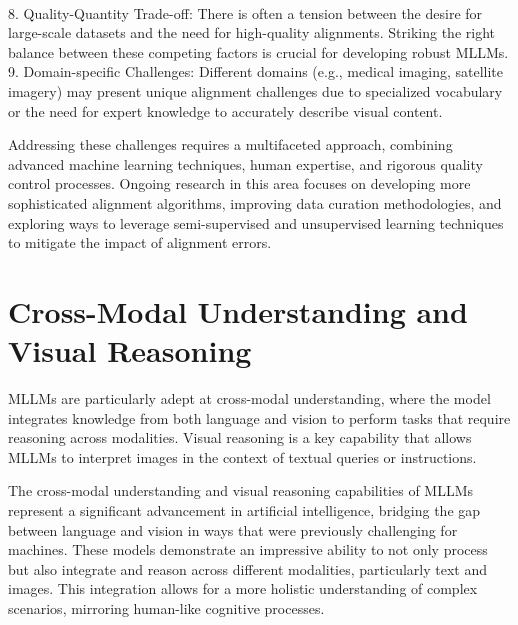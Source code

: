 \\
8. Quality-Quantity Trade-off: There is often a tension between the desire for large-scale datasets and the need for high-quality alignments. Striking the right balance between these competing factors is crucial for developing robust MLLMs.
\\
9. Domain-specific Challenges: Different domains (e.g., medical imaging, satellite imagery) may present unique alignment challenges due to specialized vocabulary or the need for expert knowledge to accurately describe visual content.

Addressing these challenges requires a multifaceted approach, combining advanced machine learning techniques, human expertise, and rigorous quality control processes. Ongoing research in this area focuses on developing more sophisticated alignment algorithms, improving data curation methodologies, and exploring ways to leverage semi-supervised and unsupervised learning techniques to mitigate the impact of alignment errors.



\section{Cross-Modal Understanding and Visual Reasoning}

MLLMs are particularly adept at cross-modal understanding, where the model integrates knowledge from both language and vision to perform tasks that require reasoning across modalities. Visual reasoning is a key capability that allows MLLMs to interpret images in the context of textual queries or instructions.

The cross-modal understanding and visual reasoning capabilities of MLLMs represent a significant advancement in artificial intelligence, bridging the gap between language and vision in ways that were previously challenging for machines. These models demonstrate an impressive ability to not only process but also integrate and reason across different modalities, particularly text and images. This integration allows for a more holistic understanding of complex scenarios, mirroring human-like cognitive processes.

